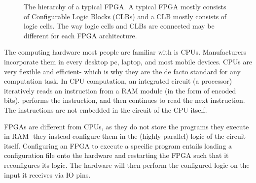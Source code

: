 \begin{figure}
\caption{The hierarchy of a typical FPGA. A typical FPGA mostly consists of Configurable Logic Blocks (CLBs) and a CLB mostly consists of logic cells. The way logic cells and CLBs are connected may be different for each FPGA architecture.}
\end{figure}


The computing hardware most people are familiar with is CPUs. Manufacturers incorporate them in every desktop pc, laptop, and most mobile devices. CPUs are very flexible and efficient- which is why they are the de facto standard for any computation task. In CPU computation, an integrated circuit (a processor) iteratively reads an instruction from a RAM module (in the form of encoded bits), performs the instruction, and then continues to read the next instruction. The instructions are not embedded in the circuit of the CPU itself.

FPGAs are different from CPUs, as they do not store the programs they execute in RAM- they instead configure them in the (highly parallel) logic of the circuit itself. Configuring an FPGA to execute a specific program entails loading a configuration file onto the hardware and restarting the FPGA such that it reconfigures its logic. The hardware will then perform the configured logic on the input it receives via IO pins. 

